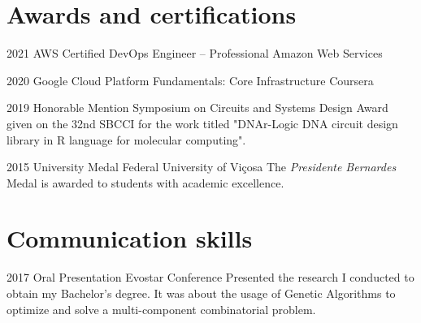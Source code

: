 \documentclass[a4paper]{cv-friggeri-x}
\begin{document}

\section{Awards and certifications}

\begin{entrylist}


\entry
    {2021}
    {AWS Certified DevOps Engineer – Professional}
    {Amazon Web Services}

\entry
    {2020}
    {Google Cloud Platform Fundamentals: Core Infrastructure}
    {Coursera}

\entry
    {2019}
    {Honorable Mention}
    {Symposium on Circuits and Systems Design}
    {Award given on the 32nd SBCCI for the work titled "DNAr-Logic DNA circuit design library in R language for molecular computing".}

\entry
    {2015}
    {University Medal}
    {Federal University of Vi\c cosa}
    {The \textit{Presidente Bernardes} Medal is awarded to students with academic excellence.}


\end{entrylist}


\section{Communication skills}

\begin{entrylist}


\entry
{2017}
{Oral Presentation}
{Evostar Conference}
{Presented the research I conducted to obtain my Bachelor's degree. It was about the usage of Genetic Algorithms to optimize and solve a multi-component combinatorial problem.}


\end{entrylist}
\end{document}
